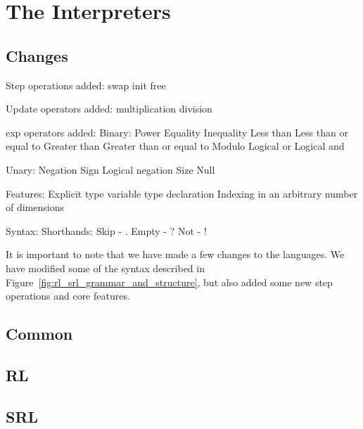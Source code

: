 
\section*{The Interpreters}
%

\subsection*{Changes}
%

Step operations added:
  swap
  init
  free

Update operators added:
  multiplication
  division

exp operators added:
  Binary:
    Power
    Equality
    Inequality
    Less than
    Less than or equal to
    Greater than
    Greater than or equal to
    Modulo
    Logical or
    Logical and

  Unary:
    Negation
    Sign
    Logical negation
    Size
    Null

Features:
  Explicit type variable type declaration
  Indexing in an arbitrary number of dimensions

Syntax:
  Shorthands:
    Skip  - .
    Empty - ?
    Not   - !

It is important to note that we have made a few changes to the languages. We have modified some of the syntax described in Figure~\ref{fig:rl_srl_grammar_and_structure}, but also added some new step operations and core features.

\subsection*{Common}
%

\subsection*{RL}
%

\subsection*{SRL}
%

